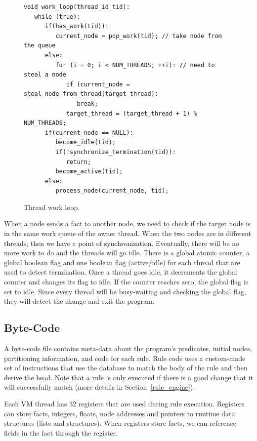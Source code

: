 \begin{figure}[h!]
   \vspace{-0.2\intextsep}
\scriptsize\begin{Verbatim}
void work_loop(thread_id tid):
   while (true):
      if(has_work(tid)):
         current_node = pop_work(tid); // take node from the queue
      else:
         for (i = 0; i < NUM_THREADS; ++i): // need to steal a node
            if (current_node = steal_node_from_thread(target_thread):
               break;
            target_thread = (target_thread + 1) % NUM_THREADS;
      if(current_node == NULL):
         become_idle(tid);
         if(!synchronize_termination(tid)):
            return;
         become_active(tid);
      else:
         process_node(current_node, tid);
\end{Verbatim}
\vspace{-0.5\intextsep}
  \caption{Thread work loop.}
  \label{code:work_loop}
  \vspace{-0.5\intextsep}
\end{figure}

When a node sends a fact to another node, we need to check if the target node is in the same work queue of the owner thread.
When the two nodes are in different threads, then we have a point of synchronization. Eventually,
there will be no more work to do and the threads will go idle. There is a global atomic counter, a global
boolean flag and one boolean flag (active/idle) for each thread that are used to detect termination.
Once a thread goes idle, it decrements the global counter and changes its flag to idle. If the counter
reaches zero, the global flag is set to idle. Since every thread will be busy-waiting and checking
the global flag, they will detect the change and exit the program.

\subsection{Byte-Code}

A byte-code file contains meta-data about the program's predicates, initial nodes, partitioning
information, and code for each rule. Rule code uses a custom-made set of instructions that
use the database to match the body of the rule and then derive the head. Note that a rule
is only executed if there is a good change that it will successfully match (more details
in Section~\ref{rule_engine}).

Each VM thread has 32 registers that are used during rule execution.
Registers can store facts, integers, floats, node addresses and pointers to runtime 
data structures (lists and structures). When registers store facts, we can reference
fields in the fact through the register.

